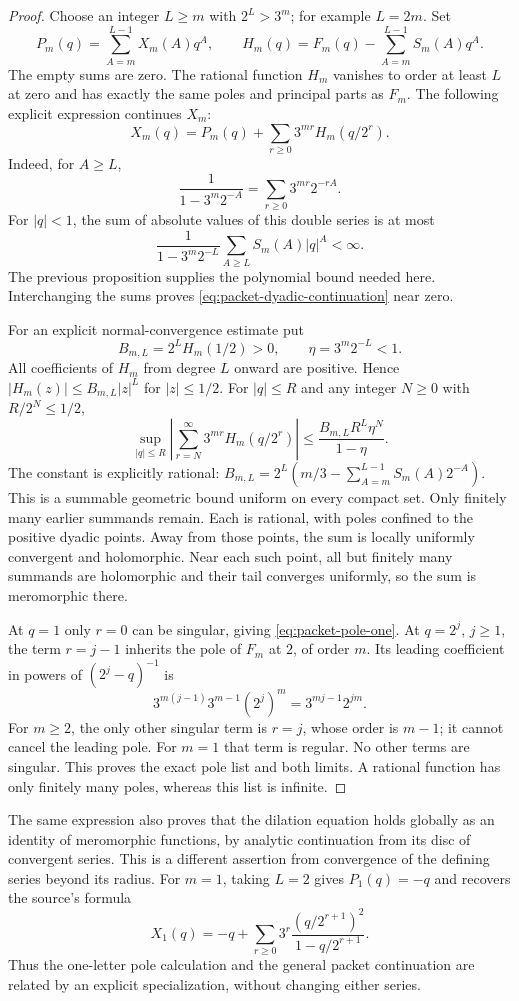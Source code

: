 \begin{proof}
Choose an integer $L\ge m$ with $2^L>3^m$; for example $L=2m$.
Set
\[
 P_m(q)=\sum_{A=m}^{L-1}X_m(A)q^A,\qquad
 H_m(q)=F_m(q)-\sum_{A=m}^{L-1}S_m(A)q^A.
\]
The empty sums are zero.  The rational function $H_m$ vanishes to
order at least $L$ at zero and has exactly the same poles and principal
parts as $F_m$.  The following explicit expression continues $X_m$:
\begin{equation}\label{eq:packet-dyadic-continuation}
 X_m(q)=P_m(q)+\sum_{r\ge0}3^{mr}H_m(q/2^r).
\end{equation}
Indeed, for $A\ge L$,
\[
 \frac1{1-3^m2^{-A}}=\sum_{r\ge0}3^{mr}2^{-rA}.
\]
For $|q|<1$, the sum of absolute values of this double series is at most
\[
 \frac{1}{1-3^m2^{-L}}\sum_{A\ge L}S_m(A)|q|^A<\infty.
\]
The previous proposition supplies the polynomial bound needed here.
Interchanging the sums proves \eqref{eq:packet-dyadic-continuation}
near zero.

For an explicit normal-convergence estimate put
\[
 B_{m,L}=2^L H_m(1/2)>0,\qquad \eta=3^m2^{-L}<1.
\]
All coefficients of $H_m$ from degree $L$ onward are positive.  Hence
$|H_m(z)|\le B_{m,L}|z|^L$ for $|z|\le1/2$.
For $|q|\le R$ and any integer $N\ge0$ with $R/2^N\le1/2$,
\begin{equation}\label{eq:packet-continuation-error}
 \sup_{|q|\le R}\left|\sum_{r=N}^{\infty}3^{mr}H_m(q/2^r)\right|
 \le \frac{B_{m,L}R^L\eta^N}{1-\eta}.
\end{equation}
The constant is explicitly rational:
$B_{m,L}=2^L(m/3-\sum_{A=m}^{L-1}S_m(A)2^{-A})$.
This is a summable geometric bound uniform on every compact set.
Only finitely many earlier summands remain.  Each is rational, with
poles confined to the positive dyadic points.  Away from those points,
the sum is locally uniformly convergent and holomorphic.  Near each
such point, all but finitely many summands are holomorphic and their
tail converges uniformly, so the sum is meromorphic there.

At $q=1$ only $r=0$ can be singular, giving
\eqref{eq:packet-pole-one}.  At $q=2^j$, $j\ge1$, the term $r=j-1$
inherits the pole of $F_m$ at $2$, of order $m$.  Its leading
coefficient in powers of $(2^j-q)^{-1}$ is
\[
 3^{m(j-1)}3^{m-1}(2^j)^m=3^{mj-1}2^{jm}.
\]
For $m\ge2$, the only other singular term is $r=j$, whose order is
$m-1$; it cannot cancel the leading pole.  For $m=1$ that term is
regular.  No other terms are singular.  This proves the exact pole
list and both limits.  A rational function has only finitely many
poles, whereas this list is infinite.
\end{proof}

The same expression also proves that the dilation equation holds globally
as an identity of meromorphic functions, by analytic continuation from
its disc of convergent series.  This is a different assertion from
convergence of the defining series beyond its radius.  For $m=1$, taking
$L=2$ gives $P_1(q)=-q$ and recovers the source's formula
\[
 X_1(q)=-q+\sum_{r\ge0}3^r
 \frac{(q/2^{r+1})^2}{1-q/2^{r+1}}.
\]
Thus the one-letter pole calculation and the general packet continuation
are related by an explicit specialization, without changing either series.
